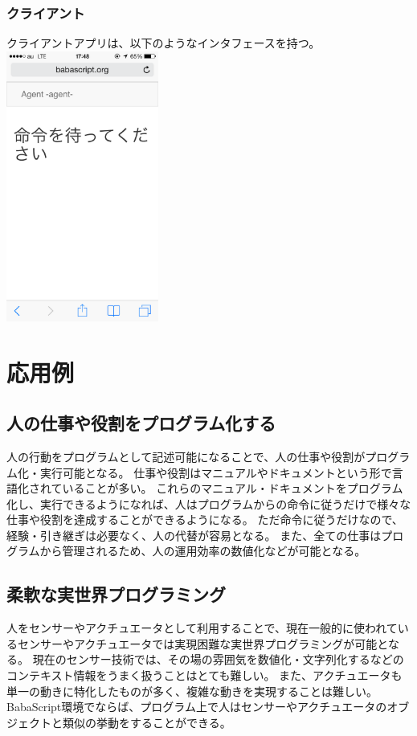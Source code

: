 \documentclass{deimj}
\begin{document}
\subsubsection{クライアント}
クライアントアプリは、以下のようなインタフェースを持つ。
\includegraphics[width=50mm, bb= 0 0 600 1065]{images/image4.png}

\section{応用例}
\subsection{人の仕事や役割をプログラム化する}
人の行動をプログラムとして記述可能になることで、人の仕事や役割がプログラム化・実行可能となる。
仕事や役割はマニュアルやドキュメントという形で言語化されていることが多い。
これらのマニュアル・ドキュメントをプログラム化し、実行できるようになれば、人はプログラムからの命令に従うだけで様々な仕事や役割を達成することができるようになる。
ただ命令に従うだけなので、経験・引き継ぎは必要なく、人の代替が容易となる。
また、全ての仕事はプログラムから管理されるため、人の運用効率の数値化などが可能となる。



\subsection{柔軟な実世界プログラミング}
人をセンサーやアクチュエータとして利用することで、現在一般的に使われているセンサーやアクチュエータでは実現困難な実世界プログラミングが可能となる。
現在のセンサー技術では、その場の雰囲気を数値化・文字列化するなどのコンテキスト情報をうまく扱うことはとても難しい。
また、アクチュエータも単一の動きに特化したものが多く、複雑な動きを実現することは難しい。
BabaScript環境でならば、プログラム上で人はセンサーやアクチュエータのオブジェクトと類似の挙動をすることができる。
\end{document}
